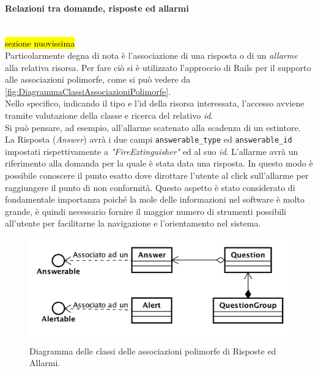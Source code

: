\paragraph*{Relazioni tra domande, risposte ed allarmi}\mbox{} \\
\hl{sezione nuovissima}\\
Particolarmente degna di nota è l'associazione di una risposta o di un \textit{allarme} alla relativa risorsa. Per fare ciò si è utilizzato l'approccio di Rails per il supporto alle associazioni polimorfe, come si può vedere da  \autoref{fig:DiagrammaClassiAssociazioniPolimorfe}.\\
Nello specifico, indicando il tipo e l'id della risorsa interessata, l'accesso avviene tramite valutazione della classe e ricerca del relativo \textit{id}. \\
Si può pensare, ad esempio, all'allarme scatenato alla scadenza di un estintore. \\
La Risposta (\textit{Answer}) avrà i due campi \texttt{answerable\_type} ed \texttt{answerable\_id} impostati rispettivamente a \textit{"FireExtinguisher"} ed al suo \textit{id}.  L'allarme avrà un riferimento alla domanda per la quale è stata data una risposta. In questo modo è possibile conoscere il punto esatto dove dirottare l'utente al click sull'allarme per raggiungere il punto di non conformità. Questo aspetto è stato considerato di fondamentale importanza poiché la mole delle informazioni nel software è molto grande, è quindi necessario fornire il maggior numero di strumenti possibili all'utente per facilitarne la navigazione e l'orientamento nel sistema.
\begin{figure}[H]
	\begin{center}
		\includegraphics[width=14cm]{Pics/diagramma_classi_associazioni_polimorfe.png}
		\caption{Diagramma delle classi delle associazioni polimorfe di Risposte ed Allarmi.}
		\label{fig:DiagrammaClassiAssociazioniPolimorfe}
	\end{center}
\end{figure}

